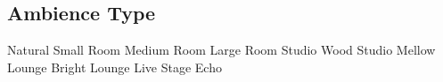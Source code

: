 \subsection{Ambience Type}









































Natural
Small Room
Medium Room
Large Room
Studio
Wood Studio
Mellow Lounge
Bright Lounge
Live Stage
Echo

